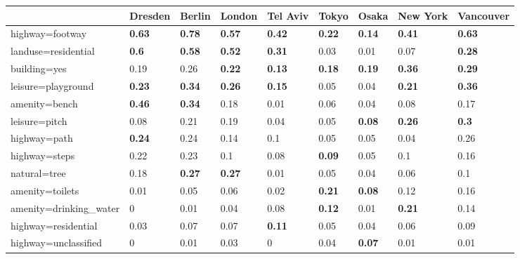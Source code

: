 \begin{tabular}{lllllllll}
\toprule
{} &        Dresden &         Berlin &         London &       Tel Aviv &          Tokyo &          Osaka &       New York &      Vancouver \\
\midrule
highway=footway         &  \textbf{0.63} &  \textbf{0.78} &  \textbf{0.57} &  \textbf{0.42} &  \textbf{0.22} &  \textbf{0.14} &  \textbf{0.41} &  \textbf{0.63} \\
landuse=residential     &   \textbf{0.6} &  \textbf{0.58} &  \textbf{0.52} &  \textbf{0.31} &           0.03 &           0.01 &           0.07 &  \textbf{0.28} \\
building=yes            &           0.19 &           0.26 &  \textbf{0.22} &  \textbf{0.13} &  \textbf{0.18} &  \textbf{0.19} &  \textbf{0.36} &  \textbf{0.29} \\
leisure=playground      &  \textbf{0.23} &  \textbf{0.34} &  \textbf{0.26} &  \textbf{0.15} &           0.05 &           0.04 &  \textbf{0.21} &  \textbf{0.36} \\
amenity=bench           &  \textbf{0.46} &  \textbf{0.34} &           0.18 &           0.01 &           0.06 &           0.04 &           0.08 &           0.17 \\
leisure=pitch           &           0.08 &           0.21 &           0.19 &           0.04 &           0.05 &  \textbf{0.08} &  \textbf{0.26} &   \textbf{0.3} \\
highway=path            &  \textbf{0.24} &           0.24 &           0.14 &            0.1 &           0.05 &           0.05 &           0.04 &           0.26 \\
highway=steps           &           0.22 &           0.23 &            0.1 &           0.08 &  \textbf{0.09} &           0.05 &            0.1 &           0.16 \\
natural=tree            &           0.18 &  \textbf{0.27} &  \textbf{0.27} &           0.01 &           0.05 &           0.04 &           0.06 &            0.1 \\
amenity=toilets         &           0.01 &           0.05 &           0.06 &           0.02 &  \textbf{0.21} &  \textbf{0.08} &           0.12 &           0.16 \\
amenity=drinking\_water &              0 &           0.01 &           0.04 &           0.08 &  \textbf{0.12} &           0.01 &  \textbf{0.21} &           0.14 \\
highway=residential     &           0.03 &           0.07 &           0.07 &  \textbf{0.11} &           0.05 &           0.04 &           0.06 &           0.09 \\
highway=unclassified    &              0 &           0.01 &           0.03 &              0 &           0.04 &  \textbf{0.07} &           0.01 &           0.01 \\
\bottomrule
\end{tabular}
